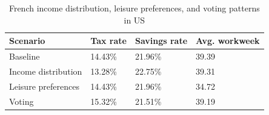 \begin{table}[!htb]
\centering
\begin{threeparttable}
\caption{French income distribution, leisure preferences, and voting patterns in US}
\label{table:US:otherShocks}
\renewcommand{\arraystretch}{1.25}
\begin{tabularx}{.9\textwidth}{lYYY}
\toprule
\textbf{Scenario} & \textbf{Tax rate} & \textbf{Savings rate} & \textbf{Avg. workweek}\\
\midrule 
Baseline & 14.43\% & 21.96\% & 39.39 \\
Income distribution & 13.28\% & 22.75\% & 39.31 \\
Leisure preferences & 14.43\% & 21.96\% & 34.72 \\
Voting & 15.32\% & 21.51\% & 39.19 \\
\bottomrule
\end{tabularx}
\end{threeparttable}
\end{table}
